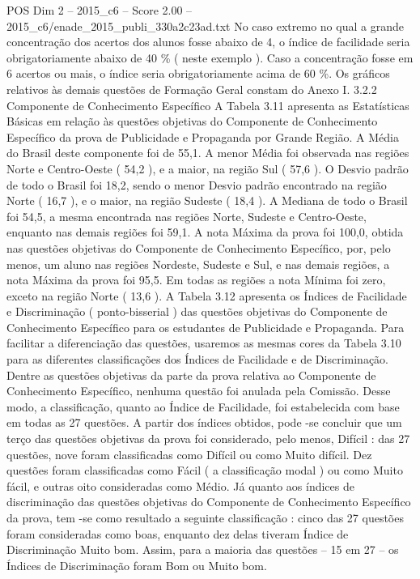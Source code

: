 \begin{textsample}{POS Dim 2 – 2015\_c6 – Score 2.00 – 2015\_c6/enade\_2015\_publi\_330a2c23ad.txt}
No caso extremo no qual a grande concentração dos acertos dos alunos fosse abaixo de 4, o índice de facilidade seria obrigatoriamente abaixo de 40 \% ( neste exemplo ).
Caso a concentração fosse em 6 acertos ou mais, o índice seria obrigatoriamente acima de 60 \%.
Os gráficos relativos às demais questões de Formação Geral constam do Anexo I. 3.2.2 Componente de Conhecimento Específico A Tabela 3.11 apresenta as Estatísticas Básicas em relação às questões objetivas do Componente de Conhecimento Específico da prova de Publicidade e Propaganda por Grande Região.
A Média do Brasil deste componente foi de 55,1.
A menor Média foi observada nas regiões Norte e Centro-Oeste ( 54,2 ), e a maior, na região Sul ( 57,6 ).
O Desvio padrão de todo o Brasil foi 18,2, sendo o menor Desvio padrão encontrado na região Norte ( 16,7 ), e o maior, na região Sudeste ( 18,4 ).
A Mediana de todo o Brasil foi 54,5, a mesma encontrada nas regiões Norte, Sudeste e Centro-Oeste, enquanto nas demais regiões foi 59,1.
A nota Máxima da prova foi 100,0, obtida nas questões objetivas do Componente de Conhecimento Específico, por, pelo menos, um aluno nas regiões Nordeste, Sudeste e Sul, e nas demais regiões, a nota Máxima da prova foi 95,5.
Em todas as regiões a nota Mínima foi zero, exceto na região Norte ( 13,6 ).
A Tabela 3.12 apresenta os Índices de Facilidade e Discriminação ( ponto-bisserial ) das questões objetivas do Componente de Conhecimento Específico para os estudantes de Publicidade e Propaganda.
Para facilitar a diferenciação das questões, usaremos as mesmas cores da Tabela 3.10 para as diferentes classificações dos Índices de Facilidade e de Discriminação.
Dentre as questões objetivas da parte da prova relativa ao Componente de Conhecimento Específico, nenhuma questão foi anulada pela Comissão.
Desse modo, a classificação, quanto ao Índice de Facilidade, foi estabelecida com base em todas as 27 questões.
A partir dos índices obtidos, pode -se concluir que um terço das questões objetivas da prova foi considerado, pelo menos, Difícil : das 27 questões, nove foram classificadas como Difícil ou como Muito difícil.
Dez questões foram classificadas como Fácil ( a classificação modal ) ou como Muito fácil, e outras oito consideradas como Médio.
Já quanto aos índices de discriminação das questões objetivas do Componente de Conhecimento Específico da prova, tem -se como resultado a seguinte classificação : cinco das 27 questões foram consideradas como boas, enquanto dez delas tiveram Índice de Discriminação Muito bom.
Assim, para a maioria das questões – 15 em 27 – os Índices de Discriminação foram Bom ou Muito bom.

\end{textsample}
